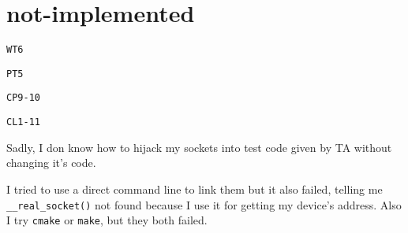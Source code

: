 \documentclass[11pt]{article}
\begin{document}
    \pagestyle{fancy}
    \chead{}

	\section*{not-implemented}
		\par \texttt{WT6}
		\par \texttt{PT5}
		\par \texttt{CP9-10}
		\par \texttt{CL1-11}
		
		\par Sadly, I don know how to hijack my sockets into test code given by TA without changing it's code.
		
		\par I tried to use a direct command line to link them but it also failed, telling me \texttt{\_\_real\_socket()} not found because I use it for getting my device's address. Also I try \texttt{cmake} or \texttt{make}, but they both failed.
		
\end{document}
